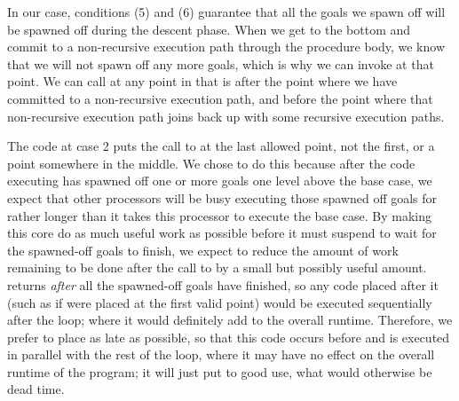 In our case, conditions (5) and (6) guarantee
that all the goals we spawn off
will be spawned off during the descent phase.
When we get to the bottom and
commit to a non-recursive execution path through the procedure body,
we know that we will not spawn off any more goals,
which is why we can invoke \lcfinish at that point.
We can call \lcfinish at any point in 
that is after the point
where we have committed to a non-recursive execution path,
and before the point where
that non-recursive execution path
joins back up with some recursive execution paths.

The code at case 2 puts the call to \lcfinish
at the last allowed point, not the first, or a point somewhere in the middle.
We chose to do this because after the code executing 
has spawned off one or more goals one level above the base case,
we expect that other processors will be busy executing those spawned off goals
for rather longer than it takes this processor to execute the base case.
By making this core do as much useful work as possible
before it must suspend to wait for the spawned-off goals to finish,
we expect to reduce the amount of work remaining to be done
after the call to \lcfinish by a small but possibly useful amount.
\lcfinish returns \emph{after} all the spawned-off goals have finished,
so any code placed after it
(such as if \lcfinish were placed at the first valid point)
would be executed sequentially after the loop;
where it would definitely add to the overall runtime.
Therefore, we prefer to place \lcfinish as late as possible,
so that this code occurs before \lcfinish
and is executed in parallel with the rest of the loop,
where it may have no effect on the overall runtime of the program;
it will just put to good use, what would otherwise be dead time.

